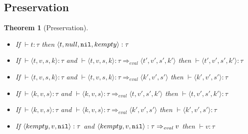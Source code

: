 \documentclass{article}
\newtheorem{theorem}{Theorem}
\begin{document}
\subsection{Preservation}

\begin{theorem}[Preservation]
  \begin{itemize} \hfill
  \item If $\vdash t : \tau$ then $\langle t, null, \mathtt{nil}, kempty \rangle : \tau$ 
  \item If $\vdash \langle t, v, s, k \rangle : \tau$ and $\vdash
    \langle t, v, s, k \rangle : \tau \Rightarrow_\mathit{eval}
    \langle t', v', s', k' \rangle$ then $\vdash \langle t', v', s',
    k' \rangle : \tau$
  \item If $\vdash \langle t, v, s, k \rangle : \tau$ and $\vdash \langle t, v,
  s, k \rangle : \tau  \Rightarrow_\mathit{eval} \langle k', v', s' \rangle$
  then $\vdash \langle k', v', s' \rangle : \tau$
  \item If $\vdash \langle k, v, s \rangle : \tau$ and $\vdash \langle k, v,
  s \rangle : \tau  \Rightarrow_\mathit{eval} \langle t, v', s', k' \rangle$
  then $\vdash \langle t, v', s', k' \rangle : \tau$
  \item If $\vdash \langle k, v, s \rangle : \tau$ and $\vdash \langle k, v,
  s \rangle : \tau  \Rightarrow_\mathit{eval} \langle k', v', s' \rangle$
  then $\vdash \langle k', v', s' \rangle : \tau$
  \item If $\langle kempty, v, \mathtt{nil} \rangle : \tau$ and $\langle kempty, v, \mathtt{nil}
  \rangle : \tau \Rightarrow_\mathit{eval} v$ then $\vdash v : \tau$ 
    
  \end{itemize}
\end{theorem}
\end{document}
